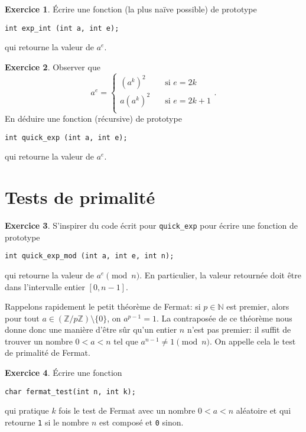 \documentclass[french,a4paper]{article}
\theoremstyle{definition}
\newtheorem{exercise}{Exercice}
\theoremstyle{remark}
\newcommand{\inlinec}[1]{\lstinline[style=C]°#1°}
\begin{document}
\begin{exercise}
  \'Ecrire une fonction (la plus naïve possible) de prototype
  \begin{lstlisting}
int exp_int (int a, int e);
  \end{lstlisting}
  qui retourne la valeur de $a^e$.
\end{exercise}

\begin{exercise}
  Observer que
  \begin{displaymath}
    a^e = \left\{
      \begin{aligned}
        (a^{k})^2 &\quad \text{si $e=2k$}\\
        a(a^{k})^2 &\quad \text{si $e=2k+1$}\\
      \end{aligned}
    \right. .
  \end{displaymath}
  En déduire une fonction (récursive) de prototype
  \begin{lstlisting}
int quick_exp (int a, int e);
  \end{lstlisting}
  qui retourne la valeur de $a^e$.
\end{exercise}

\section{Tests de primalité}
\label{sec:prime-test}

\begin{exercise}
  S'inspirer du code écrit pour \inlinec{quick_exp} pour écrire une
  fonction de prototype
  \begin{lstlisting}
int quick_exp_mod (int a, int e, int n);
  \end{lstlisting}
  qui retourne la valeur de $a^e \pmod n$. En particulier, la valeur
  retournée doit être dans l'intervalle entier $[0,n-1]$.
\end{exercise}

Rappelons rapidement le petit théorème de Fermat: si $p \in \mathbb N$
est premier, alors pour tout
$a \in (\mathbb Z/p\mathbb Z) \setminus \{0\}$, on $a^{p-1} = 1$. La
contraposée de ce théorème nous donne donc une manière d'être sûr
qu'un entier $n$ n'est pas premier: il suffit de trouver un nombre
$0<a<n$ tel que $a^{n-1} \neq 1 \pmod n$. On appelle cela le test de
primalité de Fermat.

\begin{exercise}
  \'Ecrire une fonction
  \begin{lstlisting}
char fermat_test(int n, int k);
  \end{lstlisting}
  qui pratique $k$ fois le test de Fermat avec un nombre $0<a<n$
  aléatoire et qui retourne \inlinec{1} si le nombre $n$ est composé
  et \inlinec{0} sinon.
\end{exercise}
\end{document}
